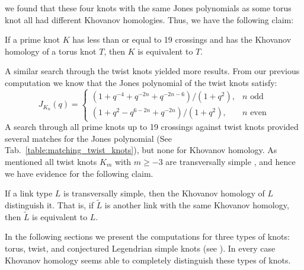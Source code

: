 we found that these four knots with the same Jones polynomials as some
torus knot all had different Khovanov homologies. Thus, we have the
following claim:
\begin{theorem}
    If a prime knot $K$ has less than or equal to 19 crossings and has
    the Khovanov homology of a torus knot $T$,
    then $K$ is equivalent to $T$.
\end{theorem}
A similar search through the twist knots yielded more results.
From our previous computation we know that the Jones polynomial of the twist
knots satisfy:
\begin{equation}
    J_{K_{n}}(q)=
    \begin{cases}
        (1+q^{-4}+q^{-2n}+q^{-2n-6})/(1+q^{2}),&n\textrm{ odd}\\
        (1+q^{2}-q^{6-2n}+q^{-2n})/(1+q^{2}),&n\textrm{ even}
    \end{cases}
\end{equation}
A search through all prime knots up to 19 crossings against twist knots
provided several matches for the Jones polynomial
(See Tab.~\ref{table:matching_twist_knots}), but
none for Khovanov homology. As mentioned all twist knots $K_{m}$ with
$m\geq{-3}$ are transversally simple
\cite{EtnyreEtAlLegendrianAndTransverseTwistKnots}, and hence we have evidence
for the following claim.
\begin{conjecture}
    If a link type $L$ is transversally simple, then the Khovanov
    homology of $L$ distinguish it. That is, if $\tilde{L}$
    is another link with the same Khovanov homology, then $\tilde{L}$ is
    equivalent to $L$.
\end{conjecture}
In the following sections we present the computations for three types of knots:
torus, twist, and conjectured Legendrian simple knots
(see \cite{LegendrianKnotAtlas}). In every case Khovanov
homology seems able to completely distinguish these types of knots.
